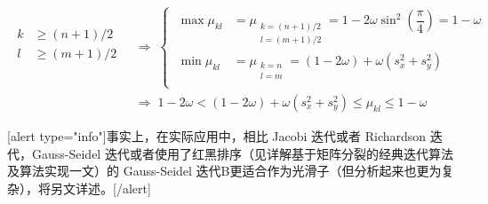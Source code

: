 \documentclass[12pt, UTF8, nofonts]{ctexart}
\begin{document}
\begin{equation}
  \label{eq:1dhighrange}
  \begin{aligned}
    \begin{aligned}
      k &\geq (n+1)/2 \\
      l &\geq (m+1)/2 \\
    \end{aligned}
    \;&\Rightarrow\;
    \left\{\; \begin{aligned}
      \max\mu_{kl} &= \mu_{\substack{k=(n+1)/2\\l=(m+1)/2}} = 1 - 2\omega \sin^2\left(\dfrac{\pi}{4}\right) = 1 - \omega \\
      \min\mu_{kl} &= \mu_{\substack{k=n\\l=m}} = (1-2\omega)+\omega (s_x^2+s_y^2) \\
    \end{aligned}\right. \\
    &\Rightarrow\; 1-2\omega < (1-2\omega) + \omega (s_x^2+s_y^2) \leq \mu_{kl} \leq 1 - \omega
  \end{aligned}
\end{equation}

[alert type="info"]事实上，在实际应用中，相比 Jacobi 迭代或者 Richardson 迭代，Gauss-Seidel 迭代或者使用了红黑排序（见详解基于矩阵分裂的经典迭代算法及算法实现一文）的 Gauss-Seidel 迭代B更适合作为光滑子（但分析起来也更为复杂），将另文详述。[/alert]

\end{document}
